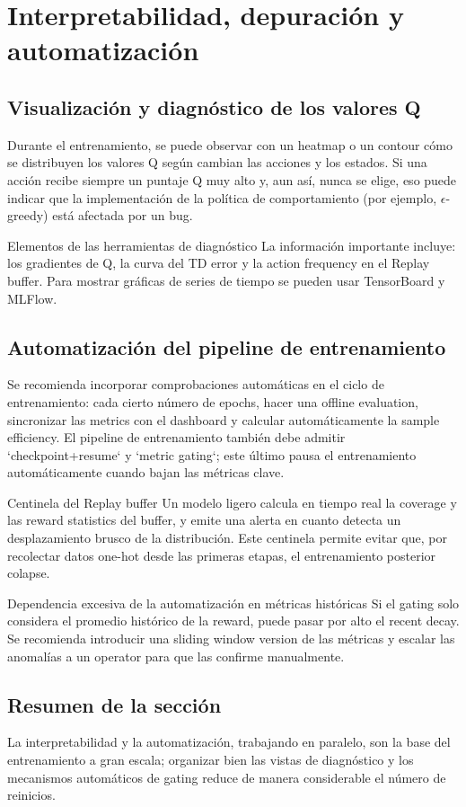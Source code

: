 \section{Interpretabilidad, depuración y automatización}

\subsection{Visualización y diagnóstico de los valores Q}

Durante el entrenamiento, se puede observar con un heatmap o un contour cómo se distribuyen los valores Q según cambian las acciones y los estados. Si una acción recibe siempre un puntaje Q muy alto y, aun así, nunca se elige, eso puede indicar que la implementación de la política de comportamiento (por ejemplo, $\epsilon$-greedy) está afectada por un bug.

\begin{knowledgebox}{Elementos de las herramientas de diagnóstico}
La información importante incluye: los gradientes de Q, la curva del TD error y la action frequency en el Replay buffer. Para mostrar gráficas de series de tiempo se pueden usar TensorBoard y MLFlow.
\end{knowledgebox}

\subsection{Automatización del pipeline de entrenamiento}

Se recomienda incorporar comprobaciones automáticas en el ciclo de entrenamiento: cada cierto número de epochs, hacer una offline evaluation, sincronizar las metrics con el dashboard y calcular automáticamente la sample efficiency. El pipeline de entrenamiento también debe admitir `checkpoint+resume` y `metric gating`; este último pausa el entrenamiento automáticamente cuando bajan las métricas clave.

\begin{importantbox}{Centinela del Replay buffer}
Un modelo ligero calcula en tiempo real la coverage y las reward statistics del buffer, y emite una alerta en cuanto detecta un desplazamiento brusco de la distribución. Este centinela permite evitar que, por recolectar datos one-hot desde las primeras etapas, el entrenamiento posterior colapse.
\end{importantbox}

\begin{warningbox}{Dependencia excesiva de la automatización en métricas históricas}
Si el gating solo considera el promedio histórico de la reward, puede pasar por alto el recent decay. Se recomienda introducir una sliding window version de las métricas y escalar las anomalías a un operator para que las confirme manualmente.
\end{warningbox}

\subsection{Resumen de la sección}

La interpretabilidad y la automatización, trabajando en paralelo, son la base del entrenamiento a gran escala; organizar bien las vistas de diagnóstico y los mecanismos automáticos de gating reduce de manera considerable el número de reinicios.
